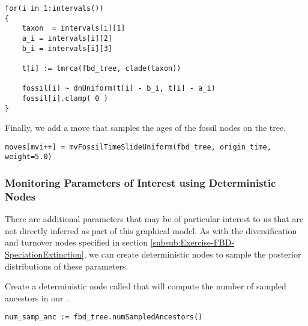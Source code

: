 {\tt \begin{snugshade*}
\begin{lstlisting}
for(i in 1:intervals())
{
    taxon  = intervals[i][1]
    a_i = intervals[i][2]
    b_i = intervals[i][3]
    
    t[i] := tmrca(fbd_tree, clade(taxon))
        
    fossil[i] ~ dnUniform(t[i] - b_i, t[i] - a_i)
    fossil[i].clamp( 0 )
}
\end{lstlisting}
\end{snugshade*}}


Finally, we add a move that samples the ages of the fossil nodes on the tree. 
{\tt \begin{snugshade*}
\begin{lstlisting}
moves[mvi++] = mvFossilTimeSlideUniform(fbd_tree, origin_time, weight=5.0)
\end{lstlisting}
\end{snugshade*}}

\subsubsection{Monitoring Parameters of Interest using Deterministic Nodes}\label{subsub:Exercise-FBD-DetNodes}

There are additional parameters that may be of particular interest to us that are not directly inferred as part of this graphical model. 
As with the diversification and turnover nodes specified in section \ref{subsub:Exercise-FBD-SpeciationExtinction}, we can create deterministic nodes to sample the posterior distributions of these parameters. 
%

Create a deterministic node called  that will compute the number of sampled ancestors in our .
{\tt \begin{snugshade*}
\begin{lstlisting}
num_samp_anc := fbd_tree.numSampledAncestors()
\end{lstlisting}
\end{snugshade*}}


